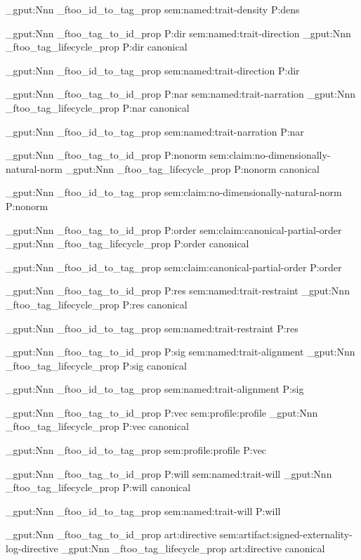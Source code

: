 \prop_gput:Nnn \g_ftoo_id_to_tag_prop { sem:named:trait-density } { P:dens }


\prop_gput:Nnn \g_ftoo_tag_to_id_prop { P:dir } { sem:named:trait-direction }
\prop_gput:Nnn \g_ftoo_tag_lifecycle_prop { P:dir } { canonical }

\prop_gput:Nnn \g_ftoo_id_to_tag_prop { sem:named:trait-direction } { P:dir }


\prop_gput:Nnn \g_ftoo_tag_to_id_prop { P:nar } { sem:named:trait-narration }
\prop_gput:Nnn \g_ftoo_tag_lifecycle_prop { P:nar } { canonical }

\prop_gput:Nnn \g_ftoo_id_to_tag_prop { sem:named:trait-narration } { P:nar }


\prop_gput:Nnn \g_ftoo_tag_to_id_prop { P:nonorm } { sem:claim:no-dimensionally-natural-norm }
\prop_gput:Nnn \g_ftoo_tag_lifecycle_prop { P:nonorm } { canonical }

\prop_gput:Nnn \g_ftoo_id_to_tag_prop { sem:claim:no-dimensionally-natural-norm } { P:nonorm }


\prop_gput:Nnn \g_ftoo_tag_to_id_prop { P:order } { sem:claim:canonical-partial-order }
\prop_gput:Nnn \g_ftoo_tag_lifecycle_prop { P:order } { canonical }

\prop_gput:Nnn \g_ftoo_id_to_tag_prop { sem:claim:canonical-partial-order } { P:order }


\prop_gput:Nnn \g_ftoo_tag_to_id_prop { P:res } { sem:named:trait-restraint }
\prop_gput:Nnn \g_ftoo_tag_lifecycle_prop { P:res } { canonical }

\prop_gput:Nnn \g_ftoo_id_to_tag_prop { sem:named:trait-restraint } { P:res }


\prop_gput:Nnn \g_ftoo_tag_to_id_prop { P:sig } { sem:named:trait-alignment }
\prop_gput:Nnn \g_ftoo_tag_lifecycle_prop { P:sig } { canonical }

\prop_gput:Nnn \g_ftoo_id_to_tag_prop { sem:named:trait-alignment } { P:sig }


\prop_gput:Nnn \g_ftoo_tag_to_id_prop { P:vec } { sem:profile:profile }
\prop_gput:Nnn \g_ftoo_tag_lifecycle_prop { P:vec } { canonical }

\prop_gput:Nnn \g_ftoo_id_to_tag_prop { sem:profile:profile } { P:vec }


\prop_gput:Nnn \g_ftoo_tag_to_id_prop { P:will } { sem:named:trait-will }
\prop_gput:Nnn \g_ftoo_tag_lifecycle_prop { P:will } { canonical }

\prop_gput:Nnn \g_ftoo_id_to_tag_prop { sem:named:trait-will } { P:will }


\prop_gput:Nnn \g_ftoo_tag_to_id_prop { art:directive } { sem:artifact:signed-externality-log-directive }
\prop_gput:Nnn \g_ftoo_tag_lifecycle_prop { art:directive } { canonical }

